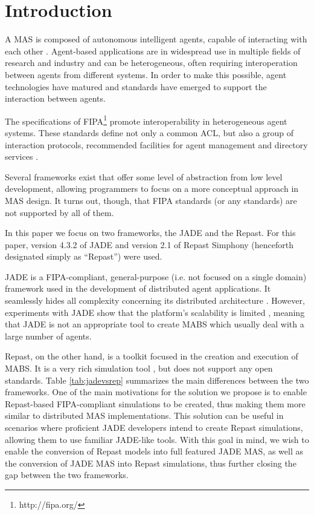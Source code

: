 \section{Introduction} %
\label{sec:introduction}

A \gls{MAS} is composed of autonomous intelligent agents, capable of interacting with each other \cite{wooldridge2008introduction}.
Agent-based applications are in widespread use in multiple fields of research and industry and can be heterogeneous, often requiring interoperation between agents from different systems.
In order to make this possible, agent technologies have matured and standards have emerged to support the interaction between agents.

The specifications of \gls{FIPA}\footnote{http://fipa.org/} promote interoperability in heterogeneous agent systems.
These standards define not only a common \gls{ACL}, but also a group of interaction protocols, recommended facilities for agent management and directory services \cite{o1998fipa}.

Several frameworks exist \cite{survey} that offer some level of abstraction from low level development, allowing programmers to focus on a more conceptual approach in \gls{MAS} design.
It turns out, though, that \gls{FIPA} standards (or any standards) are not supported by all of them.

In this paper we focus on two frameworks, the \gls{JADE} and the \gls{Repast}. For this paper, version 4.3.2 of JADE and version 2.1 of Repast Simphony (henceforth designated simply as ``Repast'') were used.

\gls{JADE} is a \gls{FIPA}-compliant, general-purpose (i.e. not focused on a single domain) framework used in the development of distributed agent applications.
It seamlessly hides all complexity concerning its distributed architecture \cite{bellifemine2003JADE}.
However, experiments with \gls{JADE} show that the platform's scalability is limited \cite{mengistu2008scalability}, meaning that \gls{JADE} is not an appropriate tool to create MABS which usually deal with a large number of agents.

Repast, on the other hand, is a toolkit focused in the creation and execution of \gls{MABS}. It is a very rich simulation tool \cite{repSimph}, but does not support any open standards. Table \ref{tab:jadevsrep} summarizes the main differences between the two frameworks. One of the main motivations for the solution we propose is to enable Repast-based \gls{FIPA}-compliant simulations to be created, thus making them more similar to distributed MAS implementations. This solution can be useful in scenarios where proficient JADE developers intend to create Repast simulations, allowing them to use familiar JADE-like tools. 
With this goal in mind, we wish to enable the conversion of Repast models into full featured \gls{JADE} MAS, as well as the conversion of \gls{JADE} MAS into Repast simulations, thus further closing the gap between the two frameworks.

